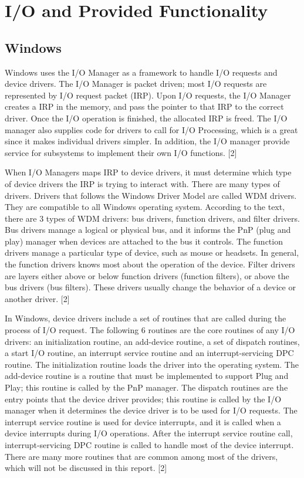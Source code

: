 \documentclass[10pt,a4paper]{article}
\begin{document}
\section{I/O and Provided Functionality}
\subsection{Windows}
Windows uses the I/O Manager as a framework to handle I/O requests and device drivers. The I/O Manager is packet driven; most I/O requests are represented by I/O request packet (IRP). Upon I/O requests, the I/O Manager creates a IRP in the memory, and pass the pointer to that IRP to the correct driver. Once the I/O operation is finished, the allocated IRP is freed. The I/O manager also supplies code for drivers to call for I/O Processing, which is a great since it makes individual drivers simpler. In addition, the I/O manager provide service for subsystems to implement their own I/O functions. [2]

When I/O Managers maps IRP to device drivers, it must determine which type of device drivers the IRP is trying to interact with. There are many types of drivers. Drivers that follows the Windows Driver Model are called WDM drivers. They are compatible to all Windows operating system. According to the text, there are 3 types of WDM drivers: bus drivers, function drivers, and filter drivers. Bus drivers manage a logical or physical bus, and it informs the PnP (plug and play) manager when devices are attached to the bus it controls. The function drivers manage a particular type of device, such as mouse or headsets. In general, the function drivers knows most about the operation of the device. Filter drivers are layers either above or below function drivers (function filters), or above the bus drivers (bus filters). These drivers usually change the behavior of a device or another driver. [2]

In Windows, device drivers include a set of routines that are called during the process of I/O request. The following 6 routines are the core routines of any I/O drivers:  an initialization routine, an add-device routine, a set of dispatch routines, a start I/O routine, an interrupt service routine and an interrupt-servicing DPC routine. The initialization routine loads the driver into the operating system. The add-device routine is a routine that must be implemented to support Plug and Play; this routine is called by the PnP manager. The dispatch routines are the entry points that the device driver provides; this routine is called by the I/O manager when it determines the device driver is to be used for I/O requests. The interrupt service routine is used for device interrupts, and it is called when a device interrupts during I/O operations. After the interrupt service routine call, interrupt-servicing DPC routine is called to handle most of the device interrupt. There are many more routines that are common among most of the drivers, which will not be discussed in this report. [2]
\end{document}
